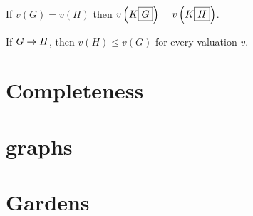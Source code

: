 \begin{corollary}[Functoriality]
  If $v(G) = v(H)$ then $v\left(K\fbox{$G$}\right) = v\left(K\fbox{$H$}\right)$.
\end{corollary}

\begin{theorem}
  If $G \rightarrow H$, then $v(H) \leq v(G)$ for every valuation $v$.
\end{theorem}

\section{Completeness}


\section{ graphs}


\section{Gardens}